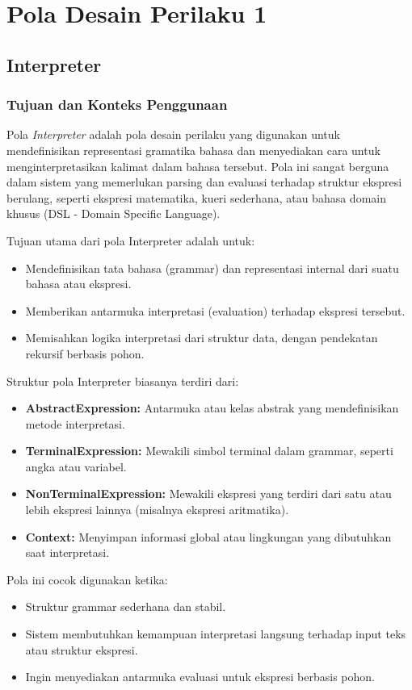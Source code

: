 \chapter{Pola Desain Perilaku 1}


\section{Interpreter}

\subsection{Tujuan dan Konteks Penggunaan}

Pola \textit{Interpreter} adalah pola desain perilaku yang digunakan untuk mendefinisikan representasi gramatika bahasa dan menyediakan cara untuk menginterpretasikan kalimat dalam bahasa tersebut. Pola ini sangat berguna dalam sistem yang memerlukan parsing dan evaluasi terhadap struktur ekspresi berulang, seperti ekspresi matematika, kueri sederhana, atau bahasa domain khusus (DSL - Domain Specific Language).

Tujuan utama dari pola Interpreter adalah untuk:
\begin{itemize}
	\item Mendefinisikan tata bahasa (grammar) dan representasi internal dari suatu bahasa atau ekspresi.
	\item Memberikan antarmuka interpretasi (evaluation) terhadap ekspresi tersebut.
	\item Memisahkan logika interpretasi dari struktur data, dengan pendekatan rekursif berbasis pohon.
\end{itemize}

Struktur pola Interpreter biasanya terdiri dari:
\begin{itemize}
	\item \textbf{AbstractExpression:} Antarmuka atau kelas abstrak yang mendefinisikan metode interpretasi.
	\item \textbf{TerminalExpression:} Mewakili simbol terminal dalam grammar, seperti angka atau variabel.
	\item \textbf{NonTerminalExpression:} Mewakili ekspresi yang terdiri dari satu atau lebih ekspresi lainnya (misalnya ekspresi aritmatika).
	\item \textbf{Context:} Menyimpan informasi global atau lingkungan yang dibutuhkan saat interpretasi.
\end{itemize}

Pola ini cocok digunakan ketika:
\begin{itemize}
	\item Struktur grammar sederhana dan stabil.
	\item Sistem membutuhkan kemampuan interpretasi langsung terhadap input teks atau struktur ekspresi.
	\item Ingin menyediakan antarmuka evaluasi untuk ekspresi berbasis pohon.
\end{itemize}

